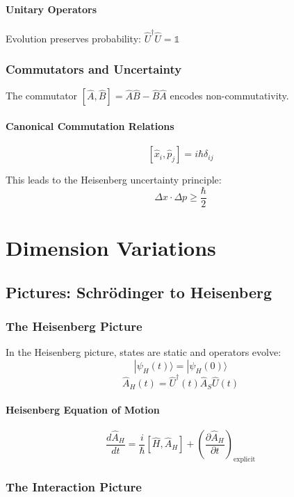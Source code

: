 \documentclass[12pt,oneside]{book}
\begin{document}
\subsection{Unitary Operators}

Evolution preserves probability: $\hat{U}^\dagger\hat{U} = \mathbb{1}$

\section{Commutators and Uncertainty}

The commutator $[\hat{A}, \hat{B}] = \hat{A}\hat{B} - \hat{B}\hat{A}$ encodes non-commutativity.

\subsection{Canonical Commutation Relations}

$$[\hat{x}_i, \hat{p}_j] = i\hbar\delta_{ij}$$

This leads to the Heisenberg uncertainty principle:
$$\Delta x \cdot \Delta p \geq \frac{\hbar}{2}$$

\part{Dimension Variations}

\chapter{Pictures: Schrödinger to Heisenberg}

\section{The Heisenberg Picture}

In the Heisenberg picture, states are static and operators evolve:
$$|\psi_H(t)\rangle = |\psi_H(0)\rangle$$
$$\hat{A}_H(t) = \hat{U}^\dagger(t)\hat{A}_S\hat{U}(t)$$

\subsection{Heisenberg Equation of Motion}

$$\frac{d\hat{A}_H}{dt} = \frac{i}{\hbar}[\hat{H}, \hat{A}_H] + \left(\frac{\partial\hat{A}_H}{\partial t}\right)_{\text{explicit}}$$

\section{The Interaction Picture}
\end{document}
